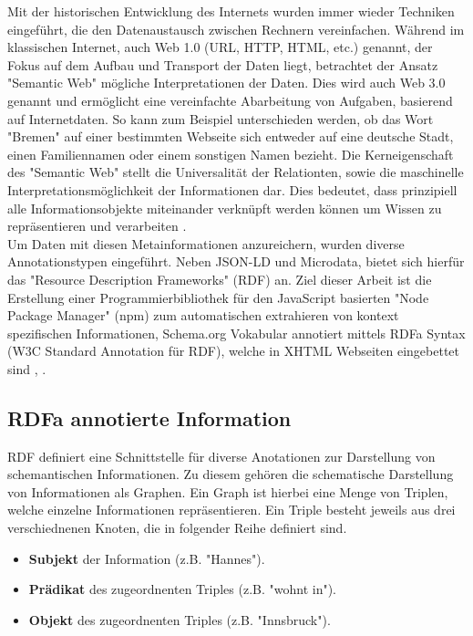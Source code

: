 \documentclass[hidelinks, a4paper, 11pt]{article} %
\begin{document}
Mit der historischen Entwicklung des Internets wurden immer wieder Techniken eingef\"uhrt, die den Datenaustausch zwischen Rechnern vereinfachen. W\"ahrend im klassischen Internet, auch Web 1.0 (URL, HTTP, HTML, etc.) genannt, der Fokus auf dem Aufbau und Transport der Daten liegt, betrachtet der Ansatz "Semantic Web" m\"ogliche Interpretationen der Daten. Dies wird auch Web 3.0 genannt und ermöglicht eine vereinfachte Abarbeitung von Aufgaben, basierend auf Internetdaten. So kann zum Beispiel unterschieden werden, ob das Wort "Bremen" auf einer bestimmten Webseite sich entweder auf eine deutsche Stadt, einen Familiennamen oder einem sonstigen Namen bezieht. Die Kerneigenschaft des "Semantic Web" stellt die Universalit\"at der Relationten, sowie die maschinelle Interpretationsmöglichkeit der Informationen dar. Dies bedeutet, dass prinzipiell alle Informationsobjekte miteinander verkn\"upft werden können um Wissen zu repr\"asentieren und verarbeiten \cite{berners2001semantic}. \\

Um Daten mit diesen Metainformationen anzureichern, wurden diverse Annotationstypen eingef\"uhrt. Neben JSON-LD und Microdata, bietet sich hierfür das "Resource Description Frameworks" (RDF) an. Ziel dieser Arbeit ist die Erstellung einer Programmierbibliothek für den JavaScript basierten "Node Package Manager" (npm) zum automatischen extrahieren von kontext spezifischen Informationen, Schema.org Vokabular annotiert mittels RDFa Syntax (W3C Standard Annotation f\"ur RDF), welche in XHTML Webseiten eingebettet sind \cite{guha2016schema}, \cite{halb2008building}.

\subsection{RDFa annotierte Information}

RDF definiert eine Schnittstelle f\"ur diverse Anotationen zur Darstellung von schemantischen Informationen. Zu diesem geh\"oren die schematische Darstellung von Informationen als Graphen. Ein Graph ist hierbei eine Menge von Triplen, welche einzelne Informationen repr\"asentieren. Ein Triple besteht jeweils aus drei verschiednenen Knoten, die in folgender Reihe definiert sind. 

\begin{itemize}
\item \textbf{Subjekt} der Information (z.B. "Hannes").
\item \textbf{Pr\"adikat} des zugeordnenten Triples (z.B. "wohnt in").
\item \textbf{Objekt} des zugeordnenten Triples  (z.B. "Innsbruck").
\end{itemize}
\end{document}
